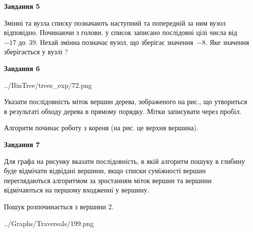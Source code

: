 \documentclass[12pt, ukrainian]{article}
\begin{document}
{\begin {large}
{\begin {center}\textbf{Завдання 5}\end {center}}\par
Змінні  та  вузла списку позначають наступний та попередній за ним вузол відповідно. Починаючи з голови, у список записано послідовні цілі числа від~$-17$ до~$39$. Нехай змінна  позначає вузол, що зберігає значення~$-8$.
Яке значення зберігається у вузлі  ?\par
\newpage

{\begin {center}\textbf{Завдання 6}\end {center}}\par

\begin{center}
	{../BinTree/trees_exp/72.png}
\end{center}
Указати послідовність міток вершин дерева, зображеного на рис., що утвориться в результаті обходу дерева в прямому порядку. Мітки записувати через пробіл.\par Алгоритм починає роботу з кореня (на рис. це верхня вершина).\par
\newpage

{\begin {center}\textbf{Завдання 7}\end {center}}\par
Для графа на рисунку вказати послідовність, в якій алгоритм пошуку в глибину буде відмічати відвідані вершини, якщо списки суміжності вершин переглядаються алгоритмом за зростанням міток вершин та вершини відмічаються на першому вход\-женні у вершину.\par
Пошук розпочинається з вершини 2.\par

\begin{center}
	{../Graphs/Traversals/199.png}
\end{center}\par
\newpage


\end{large}}
\end{document}
